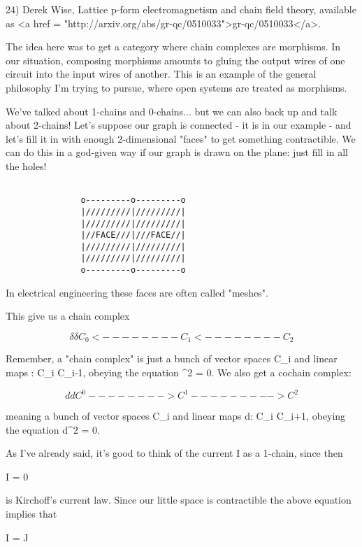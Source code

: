 24) Derek Wise, Lattice p-form electromagnetism and chain field theory,
available as <a href = "http://arxiv.org/abs/gr-qc/0510033">gr-qc/0510033</a>.

The idea here was to get a category where chain complexes are
morphisms.  In our situation, composing morphisms amounts to gluing
the output wires of one circuit into the input wires of another.  This
is an example of the general philosophy I'm trying to pursue, where
open systems are treated as morphisms.  

We've talked about 1-chains and 0-chains... but we can also back up and
talk about 2-chains!  Let's suppose our graph is connected - it is in
our example - and let's fill it in with enough 2-dimensional
"faces" to get something contractible.  We can do this in a
god-given way if our graph is drawn on the plane: just fill in all the
holes!


\begin{verbatim}

               o---------o---------o
               |/////////|/////////| 
               |/////////|/////////| 
               |//FACE///|///FACE//| 
               |/////////|/////////| 
               |/////////|/////////| 
               o---------o---------o
\end{verbatim}
    

In electrical engineering these faces are often called
"meshes".

This give us a chain complex


$$

        \delta            \delta 
C_{0} <-------- C_{1} <-------- C_{2}
$$
    

Remember, a "chain complex" is just a bunch of vector spaces C_{i} and linear maps \delta : C_{i} \to  C_{i-1}, obeying the equation \delta ^{2} = 0.  We also get a cochain complex:


$$

       d           d
C^{0} --------> C^{1} ---------> C^{2}
$$
    

meaning a bunch of vector spaces C_{i} and linear maps d: C_{i} \to  C_{i+1}, obeying the equation d^{2} = 0. 

As I've already said, it's good to think of the current I as a 1-chain,
since then

\delta I = 0 

is Kirchoff's current law.  Since our little space is contractible the
above equation implies that

I = \delta J

